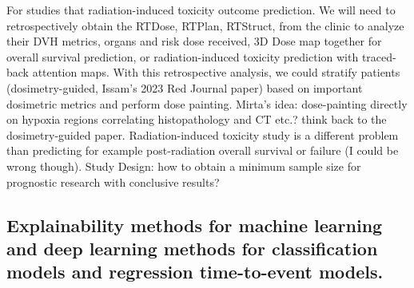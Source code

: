 \documentclass{article}%
\begin{document}
\newline%
\newline%
%
For studies that radiation{-}induced toxicity outcome prediction. We will need to retrospectively obtain the RTDose, RTPlan, RTStruct, from the clinic to analyze their DVH metrics, organs and risk dose received, 3D Dose map together for overall survival prediction, or radiation{-}induced toxicity prediction with traced{-}back attention maps. With this retrospective analysis, we could stratify patients (dosimetry{-}guided, Issam’s 2023 Red Journal paper) based on important dosimetric metrics and perform dose painting. %
\newline%
\newline%
%
Mirta’s idea: dose{-}painting directly on hypoxia regions correlating histopathology and CT etc.? think back to the dosimetry{-}guided paper. %
\newline%
\newline%
%
Radiation{-}induced toxicity study is a different problem than predicting for example post{-}radiation overall survival or failure (I could be wrong though).%
\newline%
\newline%
%
Study Design: how to obtain a minimum sample size for prognostic research with conclusive results? %
\newline%
\newline%
%
%
\newline%
\newline%
%
\subsection{Explainability methods for machine learning and deep learning methods for classification models and regression time{-}to{-}event models. }%
\label{subsec:Explainabilitymethodsformachinelearninganddeeplearningmethodsforclassificationmodelsandregressiontime{-}to{-}eventmodels.}%
\end{document}
